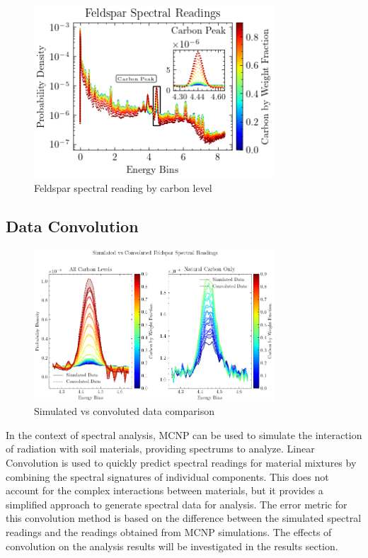 \documentclass[review]{elsarticle}
\begin{document}
\begin{figure}[H]
\centering
\includegraphics[width=0.8\textwidth]{../Figures/DataGeneration/FeldsparSpectralReadingByCarbonLevel.png}
\caption{Feldspar spectral reading by carbon level}
\label{fig:feldspar_carbon}
\end{figure}

\subsection{Data Convolution}

\begin{figure}[H]
\centering
\includegraphics[width=0.8\textwidth]{../Figures/DataGeneration/Sim_vs_Convoluted_FeldsparSpectralReadings_Combined.png}
\caption{Simulated vs convoluted data comparison}
\label{fig:sim_vs_conv}
\end{figure}

In the context of spectral analysis, MCNP can be used to simulate the interaction of radiation with soil materials, providing spectrums to analyze. Linear Convolution is used to quickly predict spectral readings for material mixtures by combining the spectral signatures of individual components. This does not account for the complex interactions between materials, but it provides a simplified approach to generate spectral data for analysis. The error metric for this convolution method is based on the difference between the simulated spectral readings and the readings obtained from MCNP simulations. The effects of convolution on the analysis results will be investigated in the results section.
\end{document}
